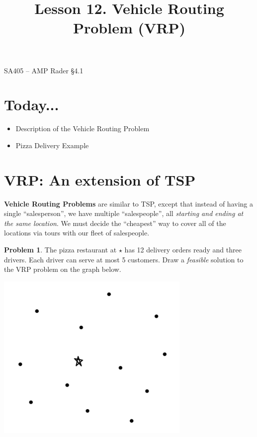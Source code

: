 \documentclass[11pt]{article}
\makeatletter
\theoremstyle{definition}
\newtheorem{problem}{Problem}
\renewcommand{\maketitle}{
  \noindent SA405 -- AMP \hfill Rader \S 4.1 \\

  \begin{center}\Large{\textbf{\@title}}\end{center}
}
\makeatother
\begin{document}
  
\title{Lesson 12.  Vehicle Routing Problem (VRP)}

\maketitle

\section{Today...}

\begin{itemize}
	\item  Description of the Vehicle Routing Problem
	\item  Pizza Delivery Example
\end{itemize}

\section{VRP:  An extension of TSP}

\textbf{Vehicle Routing Problems} are similar to TSP, except that instead of having a single ``salesperson'', we have multiple ``salespeople'', all \emph{starting and ending at the same location}.  We must decide the ``cheapest'' way to cover all of the locations via tours with our fleet of salespeople.

\begin{problem} The pizza restaurant at {\huge ${\star}$} has 12 delivery orders ready and three drivers.  Each driver can serve at most 5 customers.  Draw a \emph{feasible} solution to the VRP problem on the graph below.

\vspace{.5cm}
\begin{center}
\includegraphics[width=0.7\textwidth]{big_graph}
\end{center}
\end{problem}
\end{document}
